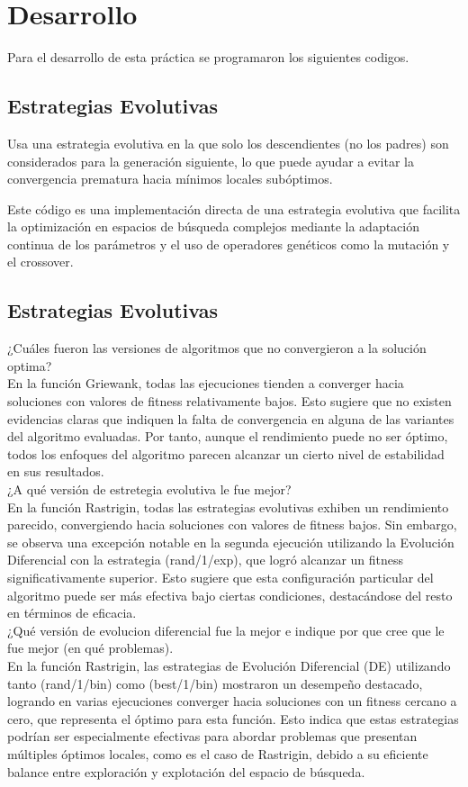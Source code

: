 \documentclass{report}
\begin{document}
\section{Desarrollo}
Para el desarrollo de esta práctica se programaron los siguientes codigos.
\subsection{Estrategias Evolutivas}
Usa una estrategia evolutiva en la que solo los descendientes (no los padres) son considerados para la generación siguiente, lo que puede ayudar a evitar la convergencia prematura hacia mínimos locales subóptimos.

Este código es una implementación directa de una estrategia evolutiva que facilita la optimización en espacios de búsqueda complejos mediante la adaptación continua de los parámetros y el uso de operadores genéticos como la mutación y el crossover.

\subsection{Estrategias Evolutivas}



¿Cuáles fueron las versiones de algoritmos que no convergieron a la solución optima?\\
En la función Griewank, todas las ejecuciones tienden a converger hacia soluciones con valores de fitness relativamente bajos. Esto sugiere que no existen evidencias claras que indiquen la falta de convergencia en alguna de las variantes del algoritmo evaluadas. Por tanto, aunque el rendimiento puede no ser óptimo, todos los enfoques del algoritmo parecen alcanzar un cierto nivel de estabilidad en sus resultados.\\
¿A qué versión de estretegia evolutiva le fue mejor?\\
En la función Rastrigin, todas las estrategias evolutivas exhiben un rendimiento parecido, convergiendo hacia soluciones con valores de fitness bajos. Sin embargo, se observa una excepción notable en la segunda ejecución utilizando la Evolución Diferencial con la estrategia (rand/1/exp), que logró alcanzar un fitness significativamente superior. Esto sugiere que esta configuración particular del algoritmo puede ser más efectiva bajo ciertas condiciones, destacándose del resto en términos de eficacia.\\
¿Qué versión de evolucion diferencial fue la mejor e indique por que cree que le fue mejor (en qué problemas).\\
En la función Rastrigin, las estrategias de Evolución Diferencial (DE) utilizando tanto (rand/1/bin) como (best/1/bin) mostraron un desempeño destacado, logrando en varias ejecuciones converger hacia soluciones con un fitness cercano a cero, que representa el óptimo para esta función. Esto indica que estas estrategias podrían ser especialmente efectivas para abordar problemas que presentan múltiples óptimos locales, como es el caso de Rastrigin, debido a su eficiente balance entre exploración y explotación del espacio de búsqueda.
\end{document}

